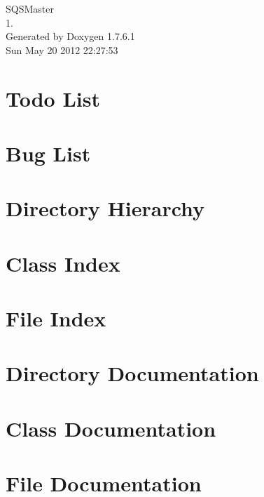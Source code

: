 \documentclass[a4paper]{book}
\begin{document}
\hypersetup{pageanchor=false,citecolor=blue}
\begin{titlepage}
\vspace*{7cm}
\begin{center}
{\Large \-S\-Q\-S\-Master \\[1ex]\large 1. }\\
\vspace*{1cm}
{\large \-Generated by Doxygen 1.7.6.1}\\
\vspace*{0.5cm}
{\small Sun May 20 2012 22:27:53}\\
\end{center}
\end{titlepage}
\clearemptydoublepage
{}
\tableofcontents
\clearemptydoublepage
{}
\hypersetup{pageanchor=true,citecolor=blue}
\chapter{\-Todo \-List}
\label{todo}
\hypertarget{todo}{}

\chapter{\-Bug \-List}
\label{bug}
\hypertarget{bug}{}

\chapter{\-Directory \-Hierarchy}

\chapter{\-Class \-Index}

\chapter{\-File \-Index}

\chapter{\-Directory \-Documentation}

\chapter{\-Class \-Documentation}








\chapter{\-File \-Documentation}








\printindex
\end{document}
